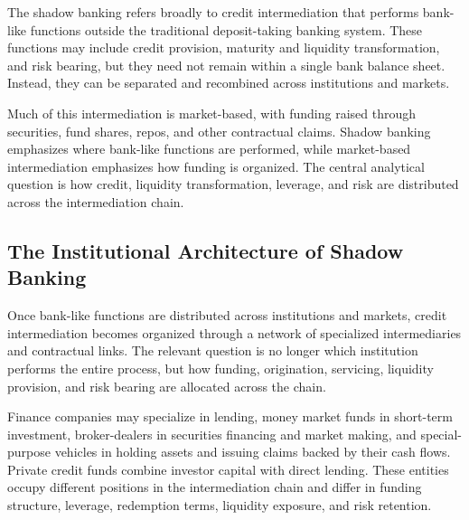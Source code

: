 The shadow banking refers broadly to credit intermediation that performs bank-like functions outside the traditional deposit-taking banking system. These functions may include credit provision, maturity and liquidity transformation, and risk bearing, but they need not remain within a single bank balance sheet. Instead, they can be separated and recombined across institutions and markets.

Much of this intermediation is market-based, with funding raised through securities, fund shares, repos, and other contractual claims. Shadow banking emphasizes where bank-like functions are performed, while market-based intermediation emphasizes how funding is organized. The central analytical question is how credit, liquidity transformation, leverage, and risk are distributed across the intermediation chain.

\subsection{The Institutional Architecture of Shadow Banking}

Once bank-like functions are distributed across institutions and markets, credit intermediation becomes organized through a network of specialized intermediaries and contractual links. The relevant question is no longer which institution performs the entire process, but how funding, origination, servicing, liquidity provision, and risk bearing are allocated across the chain.

Finance companies may specialize in lending, money market funds in short-term investment, broker-dealers in securities financing and market making, and special-purpose vehicles in holding assets and issuing claims backed by their cash flows. Private credit funds combine investor capital with direct lending. These entities occupy different positions in the intermediation chain and differ in funding structure, leverage, redemption terms, liquidity exposure, and risk retention.

